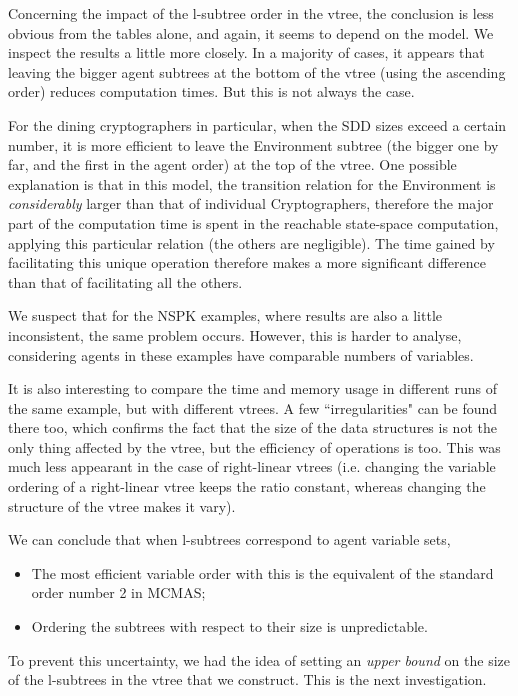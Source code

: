 \documentclass[11pt]{article}
\begin{document}
Concerning the impact of the l-subtree order in the vtree, the conclusion is less obvious from the tables alone, and again, it seems to depend on the model. We inspect the results a little more closely. In a majority of cases, it appears that leaving the bigger agent subtrees at the bottom of the vtree (using the ascending order) reduces computation times. But this is not always the case.

For the dining cryptographers in particular, when the SDD sizes exceed a certain number, it is more efficient to leave the Environment subtree (the bigger one by far, and the first in the agent order) at the top of the vtree. One possible explanation is that in this model, the transition relation for the Environment is \textit{considerably} larger than that of individual Cryptographers, therefore the major part of the computation time is spent in the reachable state-space computation, applying this particular relation (the others are negligible). The time gained by facilitating this unique operation therefore makes a more significant difference than that of facilitating all the others. 

We suspect that for the NSPK examples, where results are also a little inconsistent, the same problem occurs. However, this is harder to analyse, considering agents in these examples have comparable numbers of variables. 

It is also interesting to compare the time and memory usage in different runs of the same example, but with different vtrees. A few ``irregularities" can be found there too, which confirms the fact that the size of the data structures is not the only thing affected by the vtree, but the efficiency of operations is too. 
This was much less appearant in the case of right-linear vtrees (i.e. changing the variable ordering of a right-linear vtree keeps the ratio constant, whereas changing the structure of the vtree makes it vary). 

We can conclude that when l-subtrees correspond to agent variable sets,\begin{itemize}
\item The most efficient variable order with this is the equivalent of the standard order number 2 in MCMAS;
\item Ordering the subtrees with respect to their size is unpredictable.
\end{itemize}
To prevent this uncertainty, we had the idea of setting an \textit{upper bound} on the size of the l-subtrees in the vtree that we construct. This is the next investigation.
\end{document}
